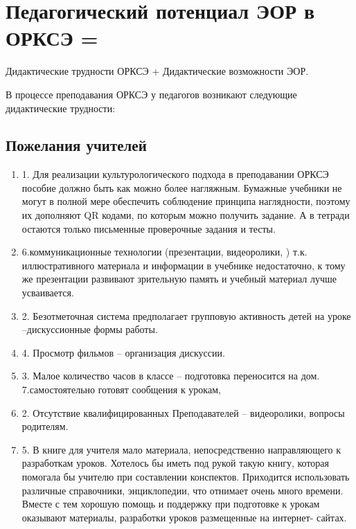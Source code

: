 \section{Педагогический потенциал ЭОР в ОРКСЭ =}
Дидактические трудности ОРКСЭ + Дидактические возможности ЭОР.


В процессе преподавания ОРКСЭ у педагогов возникают следующие дидактические трудности:
\subsection{Пожелания учителей}

\begin{enumerate}
\item 1. Для реализации культурологического подхода в преподавании ОРКСЭ пособие должно быть как можно более нагляжным. Бумажные учебники не могут в полной мере обеспечить соблюдение принципа наглядности, поэтому их дополняют QR кодами, по которым можно получить задание. А в тетради остаются только письменные проверочные задания и тесты.

\item 6.коммуникационные технологии (презентации, видеоролики, ) т.к. иллюстративного материала и информации в учебнике недостаточно, к тому же презентации развивают зрительную память и учебный материал лучше усваивается.

\item 2. Безотметочная система предполагает групповую активность детей на уроке --дискуссионные формы работы. 

\item 4. Просмотр фильмов -- организация дискуссии.

\item 3. Малое количество часов в классе -- подготовка переносится на дом.  7.самостоятельно готовят сообщения к урокам,

\item 2. Отсутствие квалифицированных Преподавателей -- видеоролики, вопросы  родителям.

\item 5. В книге для учителя мало материала, непосредственно направляющего к разработкам уроков. Хотелось  бы иметь под рукой такую книгу, которая помогала бы учителю при составлении конспектов. Приходится использовать различные справочники, энциклопедии, что отнимает очень много времени. Вместе с тем хорошую помощь и поддержку при подготовке к урокам оказывают материалы, разработки  уроков размещенные  на интернет- сайтах. 

\end{enumerate}

